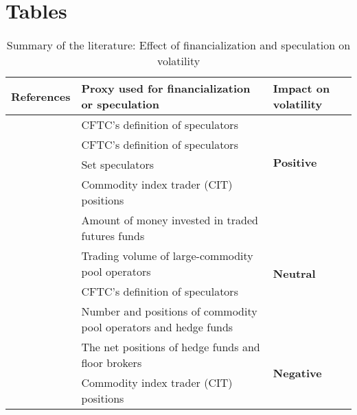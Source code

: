 \section{Tables}
\begin{landscape}
\begin{table}[]
\caption{Summary of the literature: Effect of financialization and speculation on volatility}
\label{tab:fin}
\begin{tabular}{@{}lll@{}}
\toprule
\textbf{References}                   & \textbf{Proxy used for financialization or speculation}          & \textbf{Impact on volatility}      \\ \midrule
\citet{chang1997interday}  & CFTC’s definition of speculators                                 & \multirow{4}{*}{\textbf{Positive}} \\
\citet{daigler1999impact}              & CFTC’s definition of speculators                                 &                                    \\
\citet{irwin2004effect}                 & Set speculators                                                  &                                    \\
\citet{tang2012index}                  & Commodity index trader (CIT) positions                           &                                    \\ \midrule
\citet{irwin1987note}             & Amount of money invested in traded futures funds                 & \multirow{4}{*}{\textbf{Neutral}}  \\
\citet{irwin1999managed}            & Trading volume of large-commodity pool operators                 &                                    \\
\citet{bryant2006causality}     & CFTC’s definition of speculators                                 &                                    \\
\citet{haigh2007hedge} & Number and positions of commodity pool operators and hedge funds &                                    \\ \midrule
\citet{brunetti2016speculators} & The net positions of hedge funds and floor brokers & \multirow{2}{*}{\textbf{Negative}} \\
\citet{aulerich2012bubbles}     & Commodity index trader (CIT) positions                           &                                    \\ \bottomrule
\end{tabular}
\end{table}
\end{landscape}

